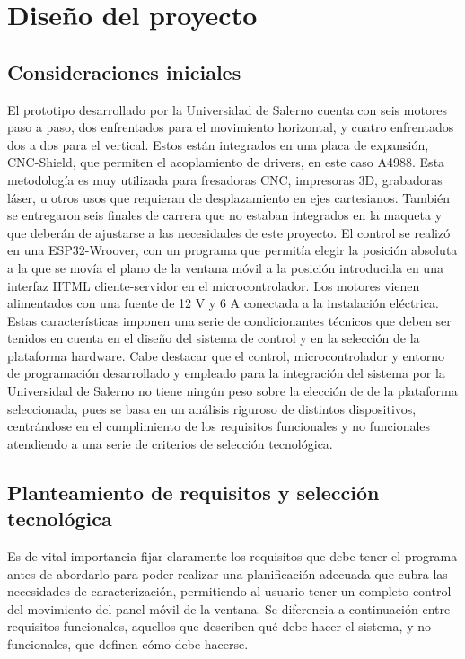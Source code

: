 \chapter{Diseño del proyecto}

\section{Consideraciones iniciales}

El prototipo desarrollado por la Universidad de Salerno cuenta con seis motores paso a paso, dos enfrentados para el movimiento horizontal, y cuatro enfrentados dos a dos para el vertical. Estos están integrados en una placa de expansión, CNC-Shield, que permiten el acoplamiento de drivers, en este caso A4988. Esta metodología es muy utilizada para fresadoras CNC, impresoras 3D, grabadoras láser, u otros usos que requieran de desplazamiento en ejes cartesianos. También se entregaron seis finales de carrera que no estaban integrados en la maqueta y que deberán de ajustarse a las necesidades de este proyecto. El control se realizó en una ESP32-Wroover, con un programa que permitía elegir la posición absoluta a la que se movía el plano de la ventana móvil a la posición introducida en una interfaz HTML cliente-servidor en el microcontrolador. Los motores vienen alimentados con una fuente de 12 V y 6 A conectada a la instalación eléctrica. Estas características imponen una serie de condicionantes técnicos que deben ser tenidos en cuenta en el diseño del sistema de control y en la selección de la plataforma hardware. 
Cabe destacar que el control, microcontrolador y entorno de programación desarrollado y empleado para la integración del sistema por la Universidad de Salerno no tiene ningún peso sobre la elección de de la plataforma seleccionada, pues se basa en un análisis riguroso de distintos dispositivos, centrándose en el cumplimiento de los requisitos funcionales y no funcionales atendiendo a una serie de criterios de selección tecnológica.

\section{Planteamiento de requisitos y selección tecnológica}

Es de vital importancia fijar claramente los requisitos que debe tener el programa antes de abordarlo para poder realizar una planificación adecuada que
cubra las necesidades de caracterización, permitiendo al usuario tener un completo control del movimiento del panel móvil de la ventana. Se diferencia a continuación entre requisitos funcionales, aquellos que describen qué debe hacer el sistema, y no funcionales, que definen cómo debe hacerse.

